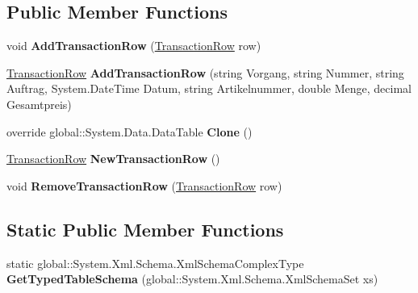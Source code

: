 \subsection*{Public Member Functions}
\begin{DoxyCompactItemize}
\item 
void {\bfseries Add\+Transaction\+Row} (\hyperlink{class_products_1_1_data_1_1ds_sage_1_1_transaction_row}{Transaction\+Row} row)\hypertarget{class_products_1_1_data_1_1ds_sage_1_1_transaction_data_table_a7f91803a9bb648e1501b54988036496e}{}\label{class_products_1_1_data_1_1ds_sage_1_1_transaction_data_table_a7f91803a9bb648e1501b54988036496e}

\item 
\hyperlink{class_products_1_1_data_1_1ds_sage_1_1_transaction_row}{Transaction\+Row} {\bfseries Add\+Transaction\+Row} (string Vorgang, string Nummer, string Auftrag, System.\+Date\+Time Datum, string Artikelnummer, double Menge, decimal Gesamtpreis)\hypertarget{class_products_1_1_data_1_1ds_sage_1_1_transaction_data_table_ac9ad948e8f92203906c486d71903240a}{}\label{class_products_1_1_data_1_1ds_sage_1_1_transaction_data_table_ac9ad948e8f92203906c486d71903240a}

\item 
override global\+::\+System.\+Data.\+Data\+Table {\bfseries Clone} ()\hypertarget{class_products_1_1_data_1_1ds_sage_1_1_transaction_data_table_ab49daa3174c5d7f6f762d0e5834fcfd6}{}\label{class_products_1_1_data_1_1ds_sage_1_1_transaction_data_table_ab49daa3174c5d7f6f762d0e5834fcfd6}

\item 
\hyperlink{class_products_1_1_data_1_1ds_sage_1_1_transaction_row}{Transaction\+Row} {\bfseries New\+Transaction\+Row} ()\hypertarget{class_products_1_1_data_1_1ds_sage_1_1_transaction_data_table_af8c7be590662b1e24dfa3a039af9ccd2}{}\label{class_products_1_1_data_1_1ds_sage_1_1_transaction_data_table_af8c7be590662b1e24dfa3a039af9ccd2}

\item 
void {\bfseries Remove\+Transaction\+Row} (\hyperlink{class_products_1_1_data_1_1ds_sage_1_1_transaction_row}{Transaction\+Row} row)\hypertarget{class_products_1_1_data_1_1ds_sage_1_1_transaction_data_table_a1c8bdc2a75d6e624006283716dcaea66}{}\label{class_products_1_1_data_1_1ds_sage_1_1_transaction_data_table_a1c8bdc2a75d6e624006283716dcaea66}

\end{DoxyCompactItemize}
\subsection*{Static Public Member Functions}
\begin{DoxyCompactItemize}
\item 
static global\+::\+System.\+Xml.\+Schema.\+Xml\+Schema\+Complex\+Type {\bfseries Get\+Typed\+Table\+Schema} (global\+::\+System.\+Xml.\+Schema.\+Xml\+Schema\+Set xs)\hypertarget{class_products_1_1_data_1_1ds_sage_1_1_transaction_data_table_a2a60d5bfc48a872c865903c70174ab06}{}\label{class_products_1_1_data_1_1ds_sage_1_1_transaction_data_table_a2a60d5bfc48a872c865903c70174ab06}

\end{DoxyCompactItemize}
